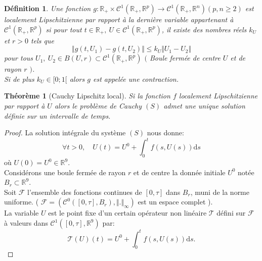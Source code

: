 \documentclass[12pt,a4paper,openany,oneside]{book}
\newtheorem{theorem}{Théorème}[chapter]
\newtheorem{definition}{Définition}[chapter]
\begin{document}
{{{{{{\begin{definition}
Une fonction $ g: \mathbb{R}_{+}\times \mathcal{C}^{1}(\mathbb{R}_{+},\mathbb{R}^{p})\rightarrow \mathcal{C}^{1}(\mathbb{R}_{+},\mathbb{R}^{n})(p,n\geq 2)$ est localement Lipschitzienne par rapport à la dernière variable appartenant à $ \mathcal{C}^{1}(\mathbb{R}_{+},\mathbb{R}^{p})$ si pour tout $ t\in\mathbb{R}_{+},\: U\in \mathcal{C}^{1}(\mathbb{R}_{+},\mathbb{R}^{p})$, il existe des nombres réels $ k_{U}$ et $ r >0 $  tels que 
$$\Vert g(t,U_{1})-g(t,U_{2})\Vert \leq k_{U}\Vert U_{1}-U_{2}\Vert $$
pour tous $U_{1},\: U_{2}\in B(U,r)\subset \mathcal{C}^{1}(\mathbb{R}_{+},\mathbb{R}^{p})$ $($ Boule fermée de centre $ U $ et de rayon $r$ $)$.\\
Si de plus $ k_{U}\in [0;1[$ alors $g$ est appelée une contraction.
\end{definition}
\bigskip 

\begin{theorem}[Cauchy Lipschitz local]
 Si la fonction  $ f $ localement Lipschitzienne par rapport à $ U $  alors le problème de Cauchy $(S)$ admet une unique solution définie sur un intervalle de temps.\\
 
\end{theorem}
  
\begin{proof}
La solution intégrale du système $(S)$ nous donne:
$$ \forall t >0,\quad U(t)= U^{0}+\int_{0}^{t} f(s,U(s))\mathrm{d}s $$
où $ U(0)=U^{0}\in \mathbb{R}^{9}$.\\

Considérons une boule fermée de rayon $r$ et de centre la donnée initiale $ U^{0}$ notée $ B_{r}\subset\mathbb{R}^{9} .$\\ 
Soit $ \mathcal{F} $ l'ensemble des fonctions continues de $[0,\tau]$ dans $B_{r}$, muni de la norme uniforme. \Big( $ \mathcal{F}=(\mathcal{C}^{0}([0,\tau],B_{r}),\Vert.\Vert_{\infty})$ est un espace complet \Big).\\

La variable $ U $ est le point fixe d'un certain opérateur non linéaire $ \mathcal{T}$ défini sur
 $ \mathcal{F}$ à valeurs dans $ \mathcal{C}^{1}([0,\tau],\mathbb{R}^{9})$ par:
$$ \mathcal{T}(U)(t)= U^{0}+\int_{0}^{t} f(s,U(s))\mathrm{d}s. $$


\end{proof}}}}}}}
\end{document}
